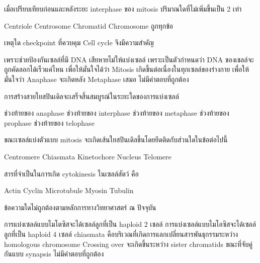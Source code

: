 \documentclass[12pt, a4paper]{exam}
\begin{document}
\begin{questions}
\filbreak
  \question เมื่อเปรียบเทียบก่อนและหลังระยะ interphase ของ mitosis ปริมาณใดที่ไม่เพิ่มขึ้นเป็น 2 เท่า
  \begin{choices}
    \choice Centriole
    \choice Centrosome
    \choice Chromatid
    \choice Chromosome
    \choice ถูกทุกข้อ
\end{choices}

\filbreak
  \question เหตุใด checkpoint ที่ควบคุม Cell cycle จึงมีความสำคัญ
  \begin{choices}
    \choice เพราะช่วยป้องกันเซลล์ที่มี DNA เสียหายไม่ให้แบ่งเซลล์
    \choice เพราะเป็นตัวกำหนดว่า DNA ของเชลล์จะถูกคัดลอกได้เร็วแค่ไหน
    \choice เพื่อให้มั่นใจได้ว่า Mitosis เกิดขึ้นต่อเนื่องในทุกเซลล์ของร่างกาย
    \choice เพื่อให้มั่นใจว่า Anaphase จะเกิดหลัง Metaphase เสมอ
    \choice ไม่มีคำตอบที่ถูกต้อง
\end{choices}

\filbreak
  \question การสร้างสายใยสปินเดิลจะเสร็จสิ้นสมบูรณ์ในระยะใดของการแบ่งเซลล์
  \begin{choices}
    \choice ช่วงท้ายของ anaphase
    \choice ช่วงท้ายของ interphase
    \choice ช่วงท้ายของ metaphase
    \choice ช่วงท้ายของ prophase
    \choice ช่วงท้ายของ telophase
\end{choices}

\filbreak
  \question ขณะเซลล์แบ่งตัวแบบ mitosis จะเกิดเส้นใยสปินเดิลขึ้นโดยยึดติดกับส่วนใดในข้อต่อไปนี้
  \begin{choices}
    \choice Centromere
    \choice Chiasmata
    \choice Kinetochore
    \choice Nucleus
    \choice Telomere
\end{choices}

\filbreak
  \question สารที่จำเป็นในการเกิด cytokinesis ในเซลล์สัตว์ คือ
  \begin{choices}
    \choice Actin
    \choice Cyclin
    \choice Microtubule
    \choice Myosin
    \choice Tubulin
\end{choices}

\filbreak
  \question ข้อความใดไม่ถูกต้องตามหลักการทางวิทยาศาสตร์ ณ ปัจจุบัน
  \begin{choices}
    \choice การแบ่งเซลล์แบบไมโตซิสจะได้เซลล์ลูกที่เป็น haploid 2 เชลล์
    \choice การแบ่งเซลล์แบบไมโอซิสจะได้เซลล์ลูกที่เป็น haploid 4 เซลล์
    \choice chiasmata คือบริเวณที่เกิดการแลกเปลี่ยนสารพันธุกรรมระหว่าง homologous chromosome
    \choice Crossing over จะเกิดขึ้นระหว่าง sister chromatids ขณะที่จับคู่กันแบบ synapsis
    \choice ไม่มีคำตอบที่ถูกต้อง
\end{choices}


\end{questions}
\end{document}
